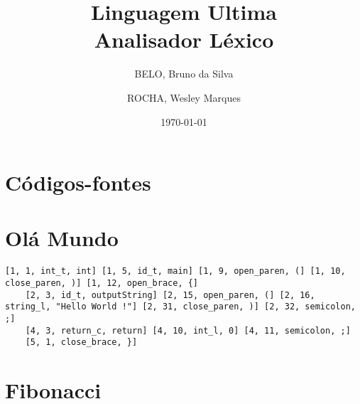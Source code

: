 \documentclass[12pt, a4paper]{memoir}
\title{Linguagem Ultima
  \\ Analisador Léxico}
\author{BELO, Bruno da Silva \and ROCHA, Wesley Marques}
\date{\today}
\begin{document}
\frontmatter
\begin{titlingpage}
  \maketitle
\end{titlingpage}

\tableofcontents

\mainmatter

\section{Códigos-fontes}
\label{sec:codigo_fonte}
















\section{Olá Mundo}
\label{sec:hello}

\begin{lstlisting}[style=result]
  [1, 1, int_t, int] [1, 5, id_t, main] [1, 9, open_paren, (] [1, 10, close_paren, )] [1, 12, open_brace, {]
    [2, 3, id_t, outputString] [2, 15, open_paren, (] [2, 16, string_l, "Hello World !"] [2, 31, close_paren, )] [2, 32, semicolon, ;]
    [4, 3, return_c, return] [4, 10, int_l, 0] [4, 11, semicolon, ;]
    [5, 1, close_brace, }]
\end{lstlisting}

\section{Fibonacci}
\label{sec:fibonacci}
\end{document}
